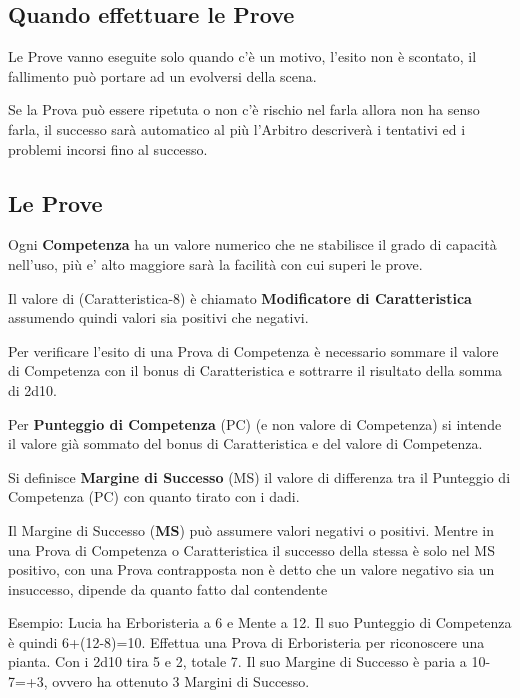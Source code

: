 \documentclass[12pt,a4paper,twoside,openany]{book}
\begin{document}
\begin{multicols}{2}
	

\subsection{Quando effettuare le Prove}

Le Prove vanno eseguite solo quando c'è un motivo, l'esito non è scontato, il fallimento può portare ad un evolversi della scena.

Se la Prova può essere ripetuta o non c'è rischio nel farla allora non ha senso farla, il successo sarà automatico al più l'Arbitro descriverà i tentativi ed i problemi incorsi fino al successo.

\subsection{Le Prove}

Ogni \textbf{Competenza} ha un valore numerico che ne stabilisce il grado di capacità nell'uso, più e' alto maggiore sarà la facilità con cui superi le prove.

Il valore di (Caratteristica-8) è chiamato \textbf{Modificatore di Caratteristica} assumendo quindi valori sia positivi che negativi.

Per verificare l'esito di una Prova di Competenza è necessario sommare il valore di Competenza con il bonus di Caratteristica e sottrarre il risultato della somma di 2d10.

Per \textbf{Punteggio di Competenza} (PC) (e non valore di Competenza) si intende il valore già sommato del bonus di Caratteristica e del valore di Competenza.

Si definisce \textbf{Margine di Successo} (MS) il valore di differenza tra il Punteggio di Competenza (PC) con quanto tirato con i dadi.

Il Margine di Successo (\textbf{MS}) può assumere valori negativi o positivi. Mentre in una Prova di Competenza o Caratteristica il successo della stessa è solo nel MS positivo, con una Prova contrapposta non è detto che un valore negativo sia un insuccesso, dipende da quanto fatto dal contendente

Esempio\textbf{}: Lucia ha Erboristeria a 6 e Mente a 12. Il suo Punteggio di Competenza è quindi 6+(12-8)=10. Effettua una Prova di Erboristeria per riconoscere una pianta. Con i 2d10 tira 5 e 2, totale 7. Il suo Margine di Successo è paria a 10-7=+3, ovvero ha ottenuto 3 Margini di Successo.


\end{multicols}
\end{document}
